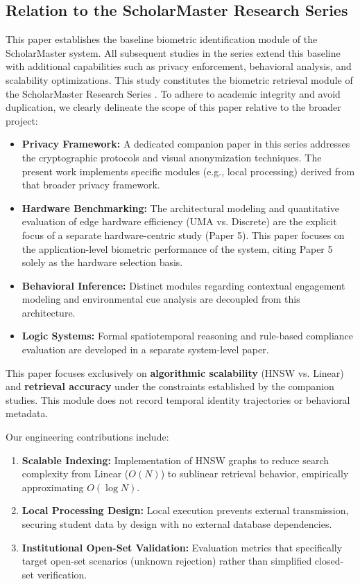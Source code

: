 \documentclass[conference]{IEEEtran}
\begin{document}
\subsection{Relation to the ScholarMaster Research Series}
This paper establishes the baseline biometric identification module of the ScholarMaster system. All subsequent studies in the series extend this baseline with additional capabilities such as privacy enforcement, behavioral analysis, and scalability optimizations. This study constitutes the biometric retrieval module of the ScholarMaster Research Series \cite{scholarmaster_repo}. To adhere to academic integrity and avoid duplication, we clearly delineate the scope of this paper relative to the broader project:
\begin{itemize}
    \item \textbf{Privacy Framework:} A dedicated companion paper in this series addresses the cryptographic protocols and visual anonymization techniques. The present work implements specific modules (e.g., local processing) derived from that broader privacy framework.
    \item \textbf{Hardware Benchmarking:} The architectural modeling and quantitative evaluation of edge hardware efficiency (UMA vs. Discrete) are the explicit focus of a separate hardware-centric study (Paper 5). This paper focuses on the application-level biometric performance of the system, citing Paper 5 solely as the hardware selection basis.
    \item \textbf{Behavioral Inference:} Distinct modules regarding contextual engagement modeling and environmental cue analysis are decoupled from this architecture.
    \item \textbf{Logic Systems:} Formal spatiotemporal reasoning and rule-based compliance evaluation are developed in a separate system-level paper.
\end{itemize}
This paper focuses exclusively on \textbf{algorithmic scalability} (HNSW vs. Linear) and \textbf{retrieval accuracy} under the constraints established by the companion studies. This module does not record temporal identity trajectories or behavioral metadata.

Our engineering contributions include:
\begin{enumerate}
    \item \textbf{Scalable Indexing:} Implementation of HNSW graphs to reduce search complexity from Linear ($O(N)$) to sublinear retrieval behavior, empirically approximating $O(\log N)$.
    \item \textbf{Local Processing Design:} Local execution prevents external transmission, securing student data by design with no external database dependencies.
    \item \textbf{Institutional Open-Set Validation:} Evaluation metrics that specifically target open-set scenarios (unknown rejection) rather than simplified closed-set verification.
\end{enumerate}
\end{document}
